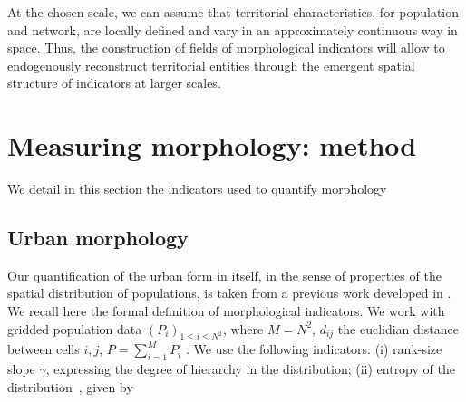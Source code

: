  At the chosen scale, we can assume that territorial characteristics, for population and network, are locally defined and vary in an approximately continuous way in space.  Thus, the construction of fields of morphological indicators will allow  to endogenously reconstruct territorial entities through the emergent spatial structure of indicators at larger scales.




\section{Measuring morphology: method}


We detail in this section the indicators used to quantify morphology


\subsection{Urban morphology}


Our quantification of the urban form in itself, in the sense of properties of the spatial distribution of populations, is taken from a previous work developed in \cite{2017arXiv170806743R}. We recall here the formal definition of morphological indicators. We work with gridded population data $(P_i)_{1\leq i \leq N^2}$, where $M=N^2$, $d_{ij}$  the euclidian distance between cells $i,j$,  $P=\sum_{i=1}^{M} P_i$ . We use the following indicators: (i) rank-size slope $\gamma$, expressing the degree of hierarchy in the distribution; (ii) entropy of the distribution~\citep{le2015forme}, given by 

